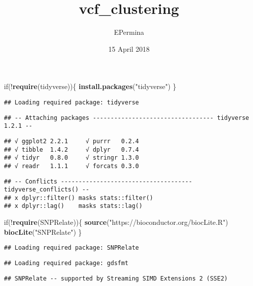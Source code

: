 \documentclass[]{article}
\title{vcf\_clustering}
\author{EPermina}
\date{15 April 2018}
\newenvironment{Shaded}{\begin{snugshade}}{\end{snugshade}}
\newcommand{\KeywordTok}[1]{\textcolor[rgb]{0.13,0.29,0.53}{\textbf{{#1}}}}
\newcommand{\StringTok}[1]{\textcolor[rgb]{0.31,0.60,0.02}{{#1}}}
\newcommand{\NormalTok}[1]{{#1}}
\begin{document}
\maketitle

\begin{Shaded}
\begin{Highlighting}[]
\NormalTok{if(!}\KeywordTok{require}\NormalTok{(tidyverse))\{}
  \KeywordTok{install.packages}\NormalTok{(}\StringTok{"tidyverse"}\NormalTok{)}
\NormalTok{\}}
\end{Highlighting}
\end{Shaded}

\begin{verbatim}
## Loading required package: tidyverse
\end{verbatim}

\begin{verbatim}
## -- Attaching packages ---------------------------------- tidyverse 1.2.1 --
\end{verbatim}

\begin{verbatim}
## √ ggplot2 2.2.1     √ purrr   0.2.4
## √ tibble  1.4.2     √ dplyr   0.7.4
## √ tidyr   0.8.0     √ stringr 1.3.0
## √ readr   1.1.1     √ forcats 0.3.0
\end{verbatim}

\begin{verbatim}
## -- Conflicts ------------------------------------- tidyverse_conflicts() --
## x dplyr::filter() masks stats::filter()
## x dplyr::lag()    masks stats::lag()
\end{verbatim}

\begin{Shaded}
\begin{Highlighting}[]
\NormalTok{if(!}\KeywordTok{require}\NormalTok{(SNPRelate))\{ }
\KeywordTok{source}\NormalTok{(}\StringTok{"https://bioconductor.org/biocLite.R"}\NormalTok{)}
\KeywordTok{biocLite}\NormalTok{(}\StringTok{"SNPRelate"}\NormalTok{)}
\NormalTok{\}}
\end{Highlighting}
\end{Shaded}

\begin{verbatim}
## Loading required package: SNPRelate
\end{verbatim}

\begin{verbatim}
## Loading required package: gdsfmt
\end{verbatim}

\begin{verbatim}
## SNPRelate -- supported by Streaming SIMD Extensions 2 (SSE2)
\end{verbatim}
\end{document}
